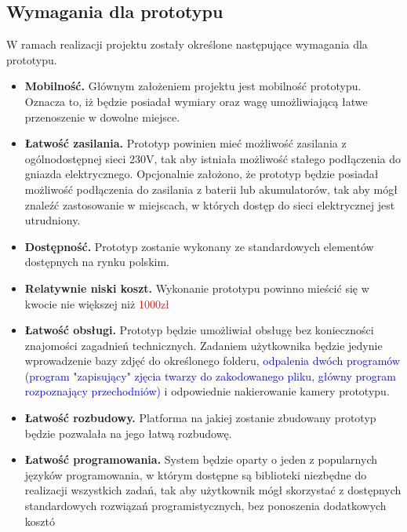 \documentclass[a4paper,12pt,reqno]{article}
\begin{document}
\subsection{Wymagania dla prototypu}
W ramach realizacji projektu zostały określone następujące wymagania dla prototypu.
\begin{itemize}
	\item \textbf{Mobilność.} Głównym założeniem projektu jest mobilność prototypu. Oznacza to, iż będzie posiadał wymiary oraz wagę umożliwiającą łatwe przenoszenie w dowolne miejsce.
	\item \textbf{Łatwość zasilania.} Prototyp powinien mieć możliwość zasilania z ogólnodostępnej sieci 230V, tak aby istniała możliwość stałego podłączenia do gniazda elektrycznego. Opcjonalnie założono, że prototyp będzie posiadał możliwość podłączenia do zasilania z baterii lub akumulatorów, tak aby mógł znaleźć zastosowanie w miejscach, w których dostęp do sieci elektrycznej jest utrudniony.
	\item \textbf{Dostępność.} Prototyp zostanie wykonany ze standardowych elementów dostępnych na rynku polskim.
	\item \textbf{Relatywnie niski koszt.} Wykonanie prototypu powinno mieścić się w kwocie nie większej niż \textcolor{red}{1000zł}
	\item \textbf{Łatwość obsługi.} Prototyp będzie umożliwiał obsługę bez konieczności znajomości zagadnień technicznych. Zadaniem użytkownika będzie jedynie wprowadzenie bazy zdjęć do określonego folderu, \textcolor{blue}{odpalenia dwóch programów (program "zapisujący" zjęcia twarzy do zakodowanego pliku, główny program rozpoznający przechodniów)} i odpowiednie nakierowanie kamery prototypu.
	\item \textbf{Łatwość rozbudowy.} Platforma na jakiej zostanie zbudowany prototyp będzie pozwalała na jego łatwą rozbudowę.
	\item \textbf{Łatwość programowania.} System będzie oparty o jeden z popularnych języków programowania, w którym dostępne są biblioteki niezbędne do realizacji wszystkich zadań, tak aby użytkownik mógł skorzystać z dostępnych standardowych rozwiązań programistycznych, bez ponoszenia dodatkowych kosztó
\end{itemize}
\end{document}

